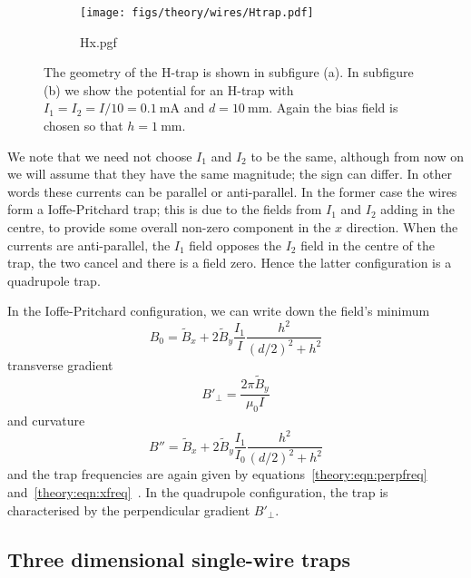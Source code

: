 \begin{figure}[htb]
  \centering
  \begin{subfigure}[b]{0.4\textwidth}
    \texttt{[image: figs/theory/wires/Htrap.pdf]}
  \end{subfigure}
  \begin{subfigure}[b]{0.4\textwidth}
    {Hx.pgf}
  \end{subfigure}
  \caption[H-trap]{The geometry of the H-trap is shown in subfigure (a). In subfigure
  (b) we show the potential for an H-trap with
  $I_1=I_2=I/10=\SI{0.1}{\milli\ampere}$ and $d=\SI{10}{\milli\meter}$. Again the bias field is chosen so
  that $h=\SI{1}{\milli\meter}$.}
  \label{theory:fig:Htrap}
\end{figure}

We note that we need not choose $I_1$ and $I_2$ to be the same, although from
now on we will assume that they have the same magnitude; the sign can differ.
In other words these currents can be parallel or anti-parallel. In the former
case the wires form a Ioffe-Pritchard trap; this is due to the fields from
$I_1$ and $I_2$ adding in the centre, to provide some overall non-zero
component in the $x$ direction. When the currents are anti-parallel, the $I_1$
field opposes the $I_2$ field in the centre of the trap, the two cancel and
there is a field zero. Hence the latter configuration is a quadrupole trap.

In the Ioffe-Pritchard configuration, we can write down the field's
minimum
%
\begin{equation}
  B_0 = \tilde{B}_x + 2\tilde{B}_y \frac{I_1}{I}\frac{h^2}{(d/2)^2 + h^2}
\end{equation}
%
transverse gradient
%
\begin{equation}
  B'_\perp = \frac{2\pi\tilde{B}_y}{\mu_0 I}
\end{equation}
%
and curvature~\cite{PhysRevA.79.013407}
%
\begin{equation}
  B'' = \tilde{B}_x + 2\tilde{B}_y\frac{I_1}{I_0}\frac{h^2}{(d/2)^2+h^2}
\end{equation}
%
and the trap frequencies are again given by equations~\ref{theory:eqn:perpfreq}
and~\ref{theory:eqn:xfreq}~\cite{PhysRevA.79.013407}. In the quadrupole
configuration, the trap is characterised by the perpendicular gradient
$B'_\perp$. 

\subsection{Three dimensional single-wire traps}

